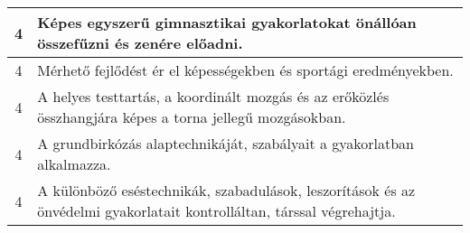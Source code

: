 \begin{longtable}{c | p{12cm} }
                                          4 &  Képes egyszerű gimnasztikai gyakorlatokat önállóan összefűzni és zenére előadni. \\ \hline
                                          4 &  Mérhető fejlődést ér el képességekben és sportági eredményekben. \\ \hline
                                          4 &  A helyes testtartás, a koordinált mozgás és az erőközlés összhangjára képes a torna jellegű mozgásokban. \\ \hline
                                          4 &  A grundbirkózás alaptechnikáját, szabályait a gyakorlatban alkalmazza. \\ \hline
                                          4 &  A különböző eséstechnikák, szabadulások, leszorítások és az önvédelmi gyakorlatait kontrolláltan, társsal végrehajtja. \\ \hline
                                      
                        \end{longtable}
            \clearpage

